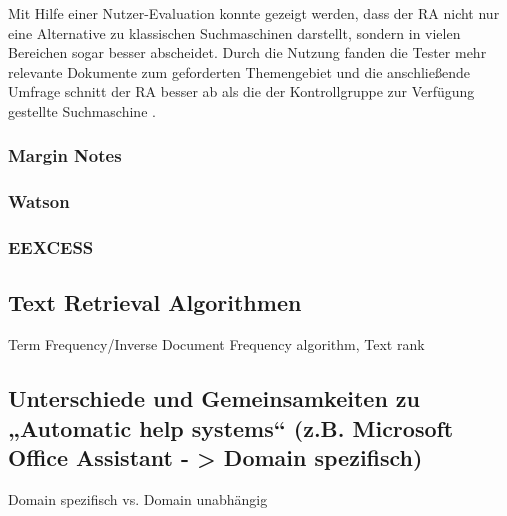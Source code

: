  	Mit Hilfe einer Nutzer-Evaluation konnte gezeigt werden, dass der RA nicht nur eine Alternative zu klassischen Suchmaschinen darstellt, sondern in vielen Bereichen sogar besser abscheidet. Durch die Nutzung fanden die Tester mehr relevante Dokumente zum geforderten Themengebiet und die anschließende Umfrage schnitt der RA besser ab als die der Kontrollgruppe zur Verfügung gestellte Suchmaschine \cite{rhodes2000just}.

 	\subsubsection{Margin Notes}
 	


 	
 	\subsubsection{Watson}
 	\subsubsection{EEXCESS}
\subsection{Text Retrieval Algorithmen}
 		Term Frequency/Inverse Document Frequency algorithm,
 		Text rank
 \subsection{Unterschiede und Gemeinsamkeiten zu „Automatic help systems“ (z.B. Microsoft Office Assistant - > Domain spezifisch)}
 	Domain spezifisch vs. Domain unabhängig